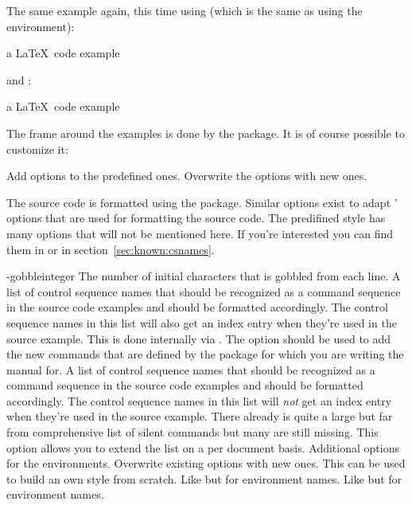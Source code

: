 \documentclass[load-preamble]{cnltx-doc}
\newcommand*\file[1]{\code{#1}}
\begin{document}
The same example again, this time using   (which is the
same as using the  environment):

\begin{example}
  a \LaTeX\ code example
\end{example}

 and :

\begin{example}[side-by-side,code-left=false]
  a \LaTeX\ code example
\end{example}

The frame around the examples is done by the  package.  It is of
course possible to customize it:
\begin{options}
  \Default
    Add options to the predefined ones.
    Overwrite the options with new ones.
\end{options}

The source code is formatted using the  package.  Similar
options exist to adapt ' options that are used for formatting
the source code.  The predifined style has many options that will not be
mentioned here.  If you're interested you can find them in
\file{cnltx-csnames.sty} or in section~\ref{sec:known:csnames}.
\begin{options}
  \keyval-{gobble}{integer}
    The number of initial characters that is gobbled from each line.
  \Default
    A list of control sequence names that should be recognized as a command
    sequence in the source code examples and should be formatted accordingly.
    The control sequence names in this list will also get an index entry when
    they're used in the source example.  This is done internally via
    .  The option should be used to add the new commands that are
    defined by the package for which you are writing the manual for.
    A list of control sequence names that should be recognized as a command
    sequence in the source code examples and should be formatted accordingly.
    The control sequence names in this list will \emph{not} get an index entry
    when they're used in the source example.  There already is quite a large
    but far from comprehensive list of silent commands but many are still
    missing.  This option allows you to extend the list on a per document
    basis.
  \Default
    Additional options for the  environments.
    Overwrite existing options with new ones.  This can be used to build an own
    style from scratch.
  \Default
    Like  but for environment names.
    Like  but for environment names.
\end{options}
\end{document}
